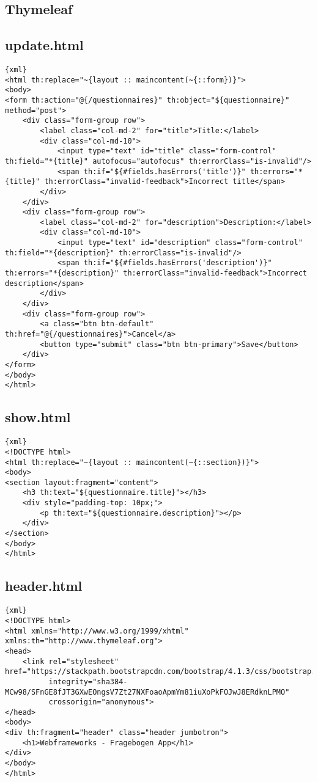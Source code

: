 \subsection*{Thymeleaf}
\subsection*{update.html}
\begin{lstlisting}[breaklines]{xml}
<html th:replace="~{layout :: maincontent(~{::form})}">
<body>
<form th:action="@{/questionnaires}" th:object="${questionnaire}" method="post">
    <div class="form-group row">
        <label class="col-md-2" for="title">Title:</label>
        <div class="col-md-10">
            <input type="text" id="title" class="form-control" th:field="*{title}" autofocus="autofocus" th:errorClass="is-invalid"/>
            <span th:if="${#fields.hasErrors('title')}" th:errors="*{title}" th:errorClass="invalid-feedback">Incorrect title</span>
        </div>
    </div>
    <div class="form-group row">
        <label class="col-md-2" for="description">Description:</label>
        <div class="col-md-10">
            <input type="text" id="description" class="form-control" th:field="*{description}" th:errorClass="is-invalid"/>
            <span th:if="${#fields.hasErrors('description')}" th:errors="*{description}" th:errorClass="invalid-feedback">Incorrect description</span>
        </div>
    </div>
    <div class="form-group row">
        <a class="btn btn-default" th:href="@{/questionnaires}">Cancel</a>
        <button type="submit" class="btn btn-primary">Save</button>
    </div>
</form>
</body>
</html>
\end{lstlisting}
\columnbreak
\subsection*{show.html}
\begin{lstlisting}[breaklines]{xml}
<!DOCTYPE html>
<html th:replace="~{layout :: maincontent(~{::section})}">
<body>
<section layout:fragment="content">
    <h3 th:text="${questionnaire.title}"></h3>
    <div style="padding-top: 10px;">
        <p th:text="${questionnaire.description}"></p>
    </div>
</section>
</body>
</html>
\end{lstlisting}
\subsection*{header.html}
\begin{lstlisting}[breaklines]{xml}
<!DOCTYPE html>
<html xmlns="http://www.w3.org/1999/xhtml" xmlns:th="http://www.thymeleaf.org">
<head>
    <link rel="stylesheet" href="https://stackpath.bootstrapcdn.com/bootstrap/4.1.3/css/bootstrap.min.css"
          integrity="sha384-MCw98/SFnGE8fJT3GXwEOngsV7Zt27NXFoaoApmYm81iuXoPkFOJwJ8ERdknLPMO"
          crossorigin="anonymous">
</head>
<body>
<div th:fragment="header" class="header jumbotron">
    <h1>Webframeworks - Fragebogen App</h1>
</div>
</body>
</html>
\end{lstlisting}
